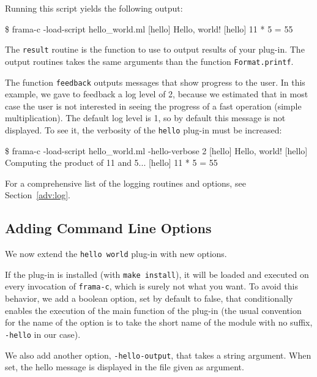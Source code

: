 
Running this script yields the following output:
\begin{shell}
\$ frama-c -load-script hello_world.ml
[hello] Hello, world!
[hello] 11 * 5 = 55
\end{shell}

The \texttt{result} routine is the function to use to output results of your
plug-in. The \framac output routines takes the same arguments than the \caml
function \texttt{Format.printf}.

The function \texttt{feedback} outputs messages that show progress to the
user. In this example, we gave to feedback a log level of 2, because
we estimated that in most case the user is not interested in seeing
the progress of a fast operation (simple multiplication). The default
log level is 1, so by default this message is not displayed. To see
it, the verbosity of the \texttt{hello} plug-in must be increased:

\begin{shell}
\$ frama-c -load-script hello_world.ml -hello-verbose 2
[hello] Hello, world!
[hello] Computing the product of 11 and 5...
[hello] 11 * 5 = 55
\end{shell}

For a comprehensive list of the logging routines and options, see
Section~\ref{adv:log}.

\subsection{Adding Command Line Options}\label{tut2:basic-options}

We now extend the \texttt{hello world} plug-in with new options.

If the plug-in is installed (with \texttt{make install}), it will be loaded and
executed on every invocation of \texttt{frama-c}, which is surely not what you
want. To avoid this behavior, we add a boolean option, set by default to false,
that conditionally enables the execution of the main function of the plug-in
(the usual convention for the name of the option is to take the short name of
the module with no suffix, \ie \texttt{-hello} in our case).

We also add another option, \texttt{-hello-output}, that takes a string
argument. When set, the hello message is displayed in the file given as
argument.

